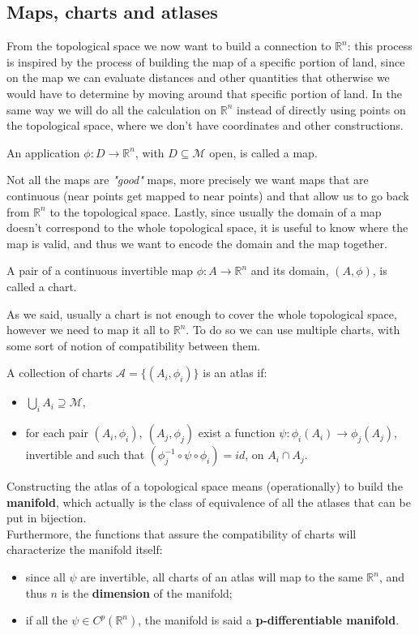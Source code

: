 \subsection{Maps, charts and atlases}
From the topological space we now want to build a connection to $\mathbb{R}^n$: this process is inspired by the process of building the map of a specific portion of land, since on the map we can evaluate distances and other quantities that otherwise we would have to determine by moving around that specific portion of land. In the same way we will do all the calculation on $\mathbb{R}^n$ instead of directly using points on the topological space, where we don't have coordinates and other constructions. 
\begin{defin}[Maps]
	An application $\phi:D\rightarrow \mathbb{R}^n$, with $D\subseteq \mathcal{M} $ open, is called a map.
\end{defin}
Not all the maps are \emph{"good"} maps, more precisely we want maps that are continuous (near points get mapped to near points) and that allow us to go back from $\mathbb{R}^n$ to the topological space. Lastly, since usually the domain of a map doesn't correspond to the whole topological space, it is useful to know where the map is valid, and thus we want to encode the domain and the map together. 
\begin{defin}[Charts]
	A pair of a continuous invertible map $\phi:A\rightarrow\mathbb{R}^n$ and its domain, $(A,\phi)$, is called a chart. 
\end{defin}
As we said, usually a chart is not enough to cover the whole topological space, however we need to map it all to $\mathbb{R}^n$. To do so we can use multiple charts, with some sort of notion of compatibility between them.
\begin{defin}[Atlases]
	A collection of charts $\mathcal{A}=\{(A_i,\phi_i)\}$ is an atlas if:
	\begin{itemize}
		\item $\bigcup_i A_i \supseteq \mathcal{M}$,
		\item for each pair $(A_i,\phi_i),\ (A_j,\phi_j)$ exist a function $\psi:\phi_i(A_i)\rightarrow\phi_j(A_j)$, invertible and such that $(\phi_j^{-1}\circ \psi\circ \phi_i)=id$, on $A_i\cap A_j$.
	\end{itemize}
\end{defin}
Constructing the atlas of a topological space means (operationally) to build the \textbf{manifold}, which actually is the class of equivalence of all the atlases that can be put in bijection.\\ Furthermore, the functions that assure the compatibility of charts will characterize the manifold itself:
\begin{itemize}
	\item since all $\psi$ are invertible, all charts of an atlas will map to the same $\mathbb{R}^n$, and thus $n$ is the \textbf{dimension} of the manifold;
	\item if all the $\psi\in C^p(\mathbb{R}^n)$, the manifold is said a \textbf{p-differentiable manifold}.
\end{itemize} 


